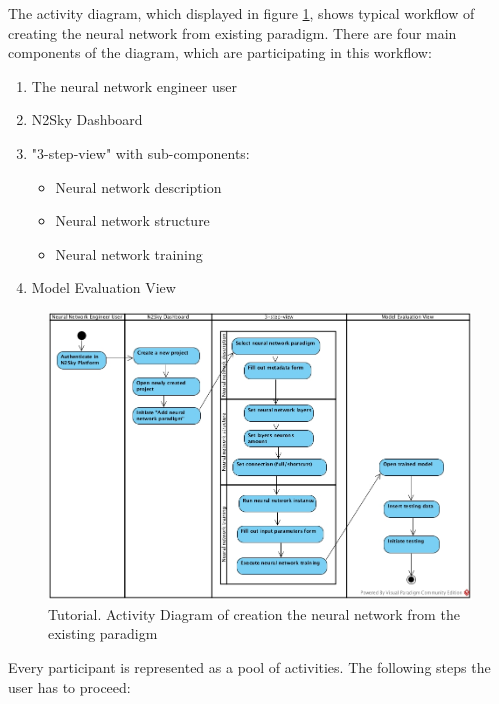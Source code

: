 The activity diagram, which displayed in figure \ref{fig:tutorial_engeneer}, shows typical workflow of creating the neural network from existing paradigm. There are four main components of the diagram, which are participating in this workflow: 
\begin{enumerate}
\item The neural network engineer user
\item N2Sky Dashboard
\item "3-step-view" with sub-components:
\begin{itemize}
\item Neural network description
\item Neural network structure
\item Neural network training
\end{itemize}
\item Model Evaluation View
\end{enumerate}

\begin{figure}[H]
\begin{center}
  \includegraphics[width=\linewidth]{components/tutorial/img/tutorial_engeneer.jpg}
  \caption{Tutorial. Activity Diagram of creation the neural network from the existing paradigm}
  \label{fig:tutorial_engeneer}
\end{center}
\end{figure} 



Every participant is represented as a pool of activities. The following steps the user has to proceed:


